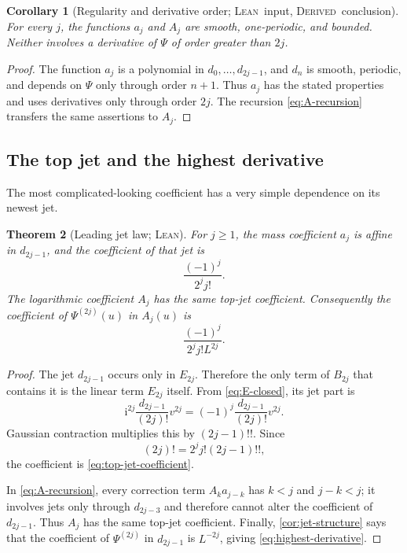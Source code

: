 \documentclass[11pt,oneside]{article}
\newtheorem{theorem}{Theorem}[section]
\newtheorem{corollary}[theorem]{Corollary}
\theoremstyle{definition}
\theoremstyle{remark}
\newcommand{\ii}{\mathrm i}
\newcommand{\Formalized}{\textsc{Lean}}
\newcommand{\Derived}{\textsc{Derived}}
\begin{document}
\begin{corollary}[Regularity and derivative order; \Formalized\ input,
\Derived\ conclusion]
\label{cor:A-structure}
For every $j$, the functions $a_j$ and $A_j$ are smooth, one-periodic,
and bounded.  Neither involves a derivative of $\Psi$ of order greater
than $2j$.
\end{corollary}

\begin{proof}
The function $a_j$ is a polynomial in
$d_0,\dots,d_{2j-1}$, and $d_n$ is smooth, periodic, and depends on
$\Psi$ only through order $n+1$.  Thus $a_j$ has the stated properties
and uses derivatives only through order $2j$.  The recursion
\eqref{eq:A-recursion} transfers the same assertions to $A_j$.
\end{proof}

\subsection{The top jet and the highest derivative}

The most complicated-looking coefficient has a very simple dependence on
its newest jet.

\begin{theorem}[Leading jet law; \Formalized]
\label{thm:top-jet}
For $j\geq1$, the mass coefficient $a_j$ is affine in $d_{2j-1}$, and
the coefficient of that jet is
\begin{equation}
 \frac{(-1)^j}{2^j j!}. \label{eq:top-jet-coefficient}
\end{equation}
The logarithmic coefficient $A_j$ has the same top-jet coefficient.
Consequently the coefficient of $\Psi^{(2j)}(u)$ in $A_j(u)$ is
\begin{equation}
 \boxed{\frac{(-1)^j}{2^j j!L^{2j}}.}
 \label{eq:highest-derivative}
\end{equation}
\end{theorem}

\begin{proof}
The jet $d_{2j-1}$ occurs only in $E_{2j}$.  Therefore the only term of
$B_{2j}$ that contains it is the linear term $E_{2j}$ itself.  From
\eqref{eq:E-closed}, its jet part is
\[
 \ii^{2j}\frac{d_{2j-1}}{(2j)!}v^{2j}
 =(-1)^j\frac{d_{2j-1}}{(2j)!}v^{2j}.
\]
Gaussian contraction multiplies this by $(2j-1)!!$.  Since
\[
 (2j)!=2^jj!(2j-1)!!,
\]
the coefficient is \eqref{eq:top-jet-coefficient}.

In \eqref{eq:A-recursion}, every correction term
$A_ka_{j-k}$ has $k<j$ and $j-k<j$; it involves jets only through
$d_{2j-3}$ and therefore cannot alter the coefficient of $d_{2j-1}$.
Thus $A_j$ has the same top-jet coefficient.  Finally,
\cref{cor:jet-structure} says that the coefficient of
$\Psi^{(2j)}$ in $d_{2j-1}$ is $L^{-2j}$, giving
\eqref{eq:highest-derivative}.
\end{proof}
\end{document}
